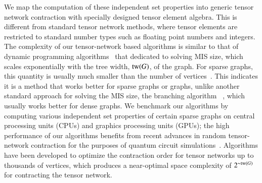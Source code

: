 \documentclass[onefignum, onetabnum]{siamart190516}
\newcommand{\<}{\langle}
\renewcommand{\>}{\rangle}
\begin{document}
We map the computation of these independent set properties into generic tensor network contraction with specially designed tensor element algebra. This is different from standard tensor network methods, where tensor elements are restricted to standard number types such as floating point numbers and integers.
The complexity of our tensor-network based algorithms is similar to that of dynamic programming algorithms~\cite{Courcelle1990, Fomin2013} that dedicated to solving MIS size,
which scales exponentially with the tree width, ${\rm tw}(G)$, of the graph.
For sparse graphs, this quantity is usually much smaller than the number of vertices~\cite{Fomin2006}.
This indicates it is a method that works better for sparse graphs or graphs,
unlike another standard approach for solving the MIS size, the branching algorithm ~\cite{Robson1986,Tarjan1977,Xiao2017}, which usually works better for dense graphs.
We benchmark our algorithms by computing various independent set properties of certain sparse graphs on central processing units (CPUs) and graphics processing units (GPUs); the high performance of our algorithms benefits from recent advances in random tensor-network contraction for the purposes of quantum circuit simulations~\cite{Gray2021, Pan2021, Kalachev2021}.
Algorithms have been developed to optimize the contraction order for tensor networks up to thousands of vertices, which produces a near-optimal space complexity of $2^{\sim{\rm tw}(G)}$ for contracting the tensor network.
\end{document}
